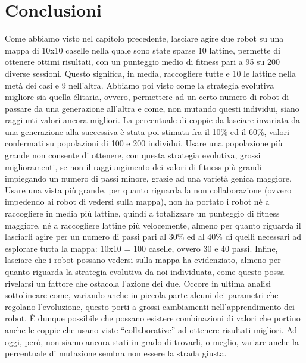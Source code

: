 \chapter{Conclusioni}
Come abbiamo visto nel capitolo precedente, lasciare agire due robot su una
mappa di 10x10 caselle nella quale sono state sparse 10 lattine, permette di
ottenere ottimi risultati, con un punteggio medio di fitness pari a 95 su 200
diverse sessioni. Questo significa, in media, raccogliere tutte e 10 le lattine
nella metà dei casi e 9 nell'altra.\newline
Abbiamo poi visto come la strategia evolutiva migliore sia quella élitaria,
ovvero, permettere ad un certo numero di robot di passare da una generazione
all'altra e come, non mutando questi individui, siano raggiunti valori ancora
migliori. La percentuale di coppie da lasciare invariata da una generazione alla
successiva è stata poi stimata fra il 10\% ed il 60\%, valori confermati su
popolazioni di 100 e 200 individui.\newline
Usare una popolazione più grande non consente di ottenere, con questa strategia
evolutiva, grossi miglioramenti, se non il raggiungimento dei valori di
fitness più grandi impiegando un numero di passi minore, grazie ad una varietà
genica maggiore.\newline
Usare una vista più grande, per quanto riguarda la non collaborazione (ovvero
impedendo ai robot di vedersi sulla mappa), non ha portato i robot né a
raccogliere in media più lattine, quindi a totalizzare un punteggio di fitness
maggiore, né a raccogliere lattine più velocemente, almeno per quanto riguarda
il lasciarli agire per un numero di passi pari al 30\% ed al 40\% di quelli
necessari ad esplorare tutta la mappa: 10x10 = 100 caselle, ovvero 30 e 40
passi.\newline
Infine, lasciare che i robot possano vedersi sulla mappa ha evidenziato, almeno
per quanto riguarda la strategia evolutiva da noi individuata, come questo possa
rivelarsi un fattore che ostacola l'azione dei due.\newline
Occore in ultima analisi sottolineare come, variando anche in piccola parte
alcuni dei parametri che regolano l'evoluzione, questo porti a grossi
cambiamenti nell'apprendimento dei robot. È dunque possibile che possano
esistere combinazioni di valori che portino anche le coppie che usano viste
``collaborative'' ad ottenere risultati migliori. Ad oggi, però, non siamo
ancora stati in grado di trovarli, o meglio, variare anche la percentuale di
mutazione sembra non essere la strada giusta.



